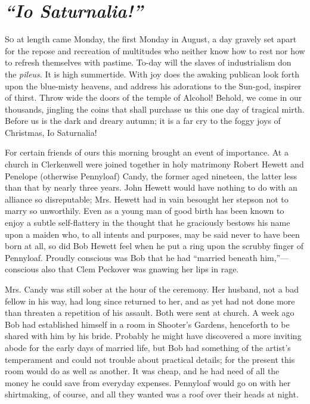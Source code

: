 \chapter{\emph{``Io Saturnalia!''}}

\textsc{So} at length came Monday, the first Monday in August, a day
gravely set apart for the repose and recreation of multitudes who
neither know how to rest nor how to refresh themselves with pastime.
To-day will the slaves of industrialism don the \emph{pileus}. It is
high summertide. With joy does the awaking publican look forth upon the
blue-misty heavens, and address his adorations to the Sun-god, inspirer
of thirst. Throw wide the doors of the temple of Alcohol! Behold, we
come in our thousands, jingling the coins that shall purchase us this
one day of tragical mirth. Before us is the dark and dreary autumn; it
is a far cry to the foggy joys of Christmas, Io Saturnalia!

For certain friends of ours this morning
{\protect\hypertarget{253}{}{}}brought an event of importance. At a
church in Clerkenwell were joined together in holy matrimony Robert
Hewett and Penelope (otherwise Pennyloaf) Candy, the former aged
nineteen, the latter less than that by nearly three years. John Hewett
would have nothing to do with an alliance so disreputable; Mrs. Hewett
had in vain besought her stepson not to marry so unworthily. Even as a
young man of good birth has been known to enjoy a subtle self-flattery
in the thought that he graciously bestows his name upon a maiden who, to
all intents and purposes, may be said never to have been born at all, so
did Bob Hewett feel when he put a ring upon the scrubby finger of
Pennyloaf. Proudly conscious was Bob that he had ``married beneath
him,''---conscious also that Clem Peckover was gnawing her lips in rage.

Mrs. Candy was still sober at the hour of the ceremony. Her husband, not
a bad fellow in his way, had long since returned to her, and as yet had
not done more than threaten a repetition of his assault. Both were
{\protect\hypertarget{254}{}{}}sent at church. A week ago Bob had
established himself in a room in Shooter's Gardens, henceforth to be
shared with him by his bride. Probably he might have discovered a more
inviting abode for the early days of married life, but Bob had something
of the artist's temperament and could not trouble about practical
details; for the present this room would do as well as another. It was
cheap, and he had need of all the money he could save from everyday
expenses. Pennyloaf would go on with her shirtmaking, of course, and all
they wanted was a roof over their heads at night.

